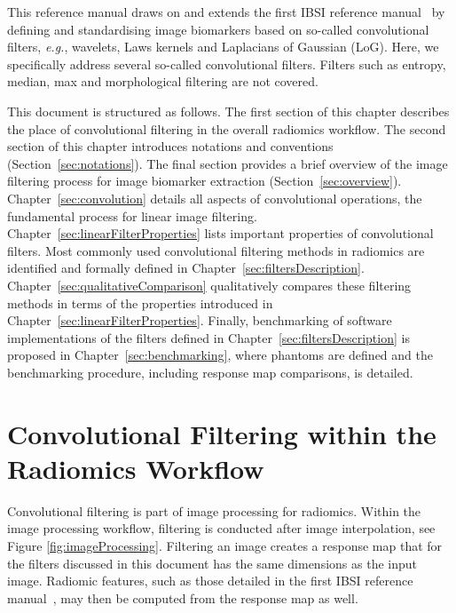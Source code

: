 \documentclass[fleqn,a4paper,oneside,openany]{book}
\begin{document}
This reference manual draws on and extends the first IBSI reference manual~\cite{ZLV2017} by defining and standardising image biomarkers based on so-called convolutional filters, \textit{e.g.}, wavelets, Laws kernels and Laplacians of Gaussian (LoG).
Here, we specifically address several so-called convolutional filters.
Filters such as entropy, median, max and morphological filtering are not covered.

This document is structured as follows.
The first section of this chapter describes the place of convolutional filtering in the overall radiomics workflow.
The second section of this chapter introduces notations and conventions (Section~\ref{sec:notations}).
The final section provides a brief overview of the image filtering process for image biomarker extraction (Section~\ref{sec:overview}).
Chapter~\ref{sec:convolution} details all aspects of convolutional operations, the fundamental process for linear image filtering.
Chapter~\ref{sec:linearFilterProperties} lists important properties of convolutional filters.
Most commonly used convolutional filtering methods in radiomics are identified and formally defined in Chapter~\ref{sec:filtersDescription}.
Chapter~\ref{sec:qualitativeComparison} qualitatively compares these filtering methods in terms of the properties introduced in Chapter~\ref{sec:linearFilterProperties}.
Finally, benchmarking of software implementations of the filters defined in Chapter~\ref{sec:filtersDescription} is proposed in Chapter~\ref{sec:benchmarking}, where phantoms are defined and the benchmarking procedure, including response map comparisons, is detailed. 

\section{Convolutional Filtering within the Radiomics Workflow}\label{sec:overallWorkflow}
Convolutional filtering is part of image processing for radiomics. Within the image processing workflow, filtering is conducted after image interpolation, see Figure \ref{fig:imageProcessing}. Filtering an image creates a response map that for the filters discussed in this document has the same dimensions as the input image. Radiomic features, such as those detailed in the first IBSI reference manual~\cite{ZLV2017}, may then be computed from the response map as well.
\end{document}
